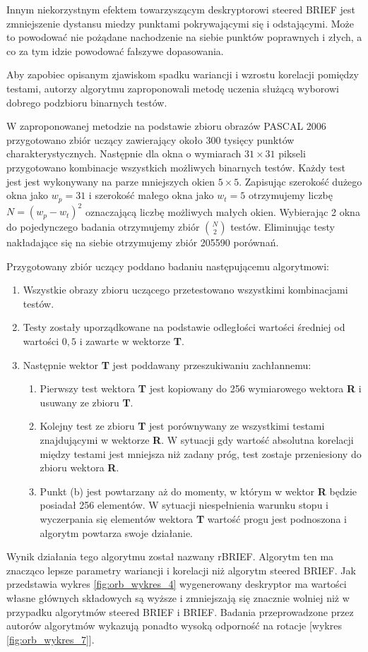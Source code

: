 Innym niekorzystnym efektem towarzyszącym deskryptorowi steered BRIEF jest zmniejszenie dystansu miedzy punktami pokrywającymi się i odstającymi. Może to powodować nie pożądane nachodzenie na siebie punktów poprawnych i złych, a co za tym idzie powodować fałszywe dopasowania.

Aby zapobiec opisanym zjawiskom spadku wariancji i wzrostu korelacji pomiędzy testami, autorzy algorytmu zaproponowali metodę uczenia służącą wyborowi dobrego podzbioru binarnych testów.

W zaproponowanej metodzie na podstawie zbioru obrazów PASCAL 2006 \cite{pascal} przygotowano zbiór uczący zawierający około 300 tysięcy punktów charakterystycznych. Następnie dla okna o wymiarach $31\times31$ pikseli przygotowano kombinacje wszystkich możliwych binarnych testów. Każdy test jest jest wykonywany na parze mniejszych okien $5\times5$. Zapisując szerokość dużego okna jako $w_p = 31$ i szerokość małego okna jako $w_t = 5$ otrzymujemy liczbę $N = (w_p - w_t)^2$ oznaczającą liczbę możliwych małych okien. Wybierając 2 okna do pojedynczego badania otrzymujemy zbiór ${N\choose 2}$ testów. Eliminując testy nakładające się na siebie otrzymujemy zbiór 205590 porównań.

Przygotowany zbiór uczący poddano badaniu następującemu algorytmowi:
\begin{enumerate}
\item Wszystkie obrazy zbioru uczącego przetestowano wszystkimi kombinacjami testów.
\item Testy zostały uporządkowane na podstawie odległości wartości średniej od wartości $0,5$ i zawarte w wektorze \textbf{T}.
\item Następnie wektor \textbf{T} jest poddawany przeszukiwaniu zachłannemu:
\begin{enumerate}
\item Pierwszy test wektora \textbf{T} jest kopiowany do 256 wymiarowego wektora \textbf{R} i usuwany ze zbioru \textbf{T}.
\item Kolejny test ze zbioru \textbf{T} jest porównywany ze wszystkimi testami znajdującymi w wektorze \textbf{R}. W sytuacji gdy wartość absolutna korelacji między testami jest mniejsza niż zadany próg, test zostaje przeniesiony do zbioru wektora \textbf{R}.
\item Punkt (b) jest powtarzany aż do momenty, w którym w wektor \textbf{R} będzie posiadał 256 elementów. W sytuacji niespełnienia warunku stopu i wyczerpania się elementów wektora \textbf{T} wartość progu jest podnoszona i algorytm powtarza swoje działanie.
\end{enumerate}
\end{enumerate}
Wynik działania tego algorytmu został nazwany rBRIEF. Algorytm ten ma znacząco lepsze parametry wariancji i korelacji niż algorytm steered BRIEF. Jak przedstawia wykres \ref{fig:orb_wykres_4} wygenerowany deskryptor ma wartości własne głównych składowych są wyższe i zmniejszają się znacznie wolniej niż w przypadku algorytmów steered BRIEF i BRIEF. Badania przeprowadzone przez autorów algorytmów wykazują ponadto wysoką odporność na rotacje [wykres \ref{fig:orb_wykres_7}].